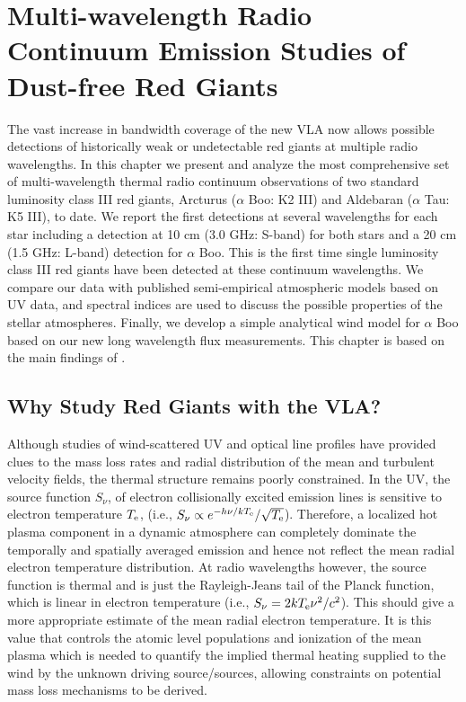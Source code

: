 
\chapter{Multi-wavelength Radio Continuum Emission Studies of \\ Dust-free Red Giants} \label{chap:6}

The vast increase in bandwidth coverage of the new VLA now allows possible detections of historically weak or undetectable red giants at multiple radio wavelengths. In this chapter we present and analyze the most comprehensive set of multi-wavelength thermal radio continuum observations of two standard luminosity class III red giants, Arcturus ($\alpha$ Boo: K2 III) and Aldebaran ($\alpha$ Tau: K5 III), to date. We report the first detections at several wavelengths for each star including a detection at 10 cm (3.0 GHz: S-band) for both stars and a 20 cm (1.5 GHz: L-band) detection for $\alpha$ Boo. This is the first time single luminosity class III red giants have been detected at these continuum wavelengths. We compare our data with published semi-empirical atmospheric models based on UV data, and spectral indices are used to discuss the possible properties of the stellar atmospheres. Finally, we develop a simple analytical wind model for $\alpha$ Boo based on our new long wavelength flux measurements. This chapter is based on the main findings of \cite{ogorman_2013}.

\section{Why Study Red Giants with the VLA?}\label{sec:6.1}
Although studies of wind-scattered UV and optical line profiles have provided clues to the mass loss rates and radial distribution of the mean and turbulent velocity fields, the thermal structure remains poorly constrained. In the UV, the source function $S_{\nu}$, of electron collisionally excited emission lines is sensitive to electron temperature $T_{\rm{e}}$, (i.e., $S_{\nu} \propto e^{-h\nu /kT_{\rm{e}}}/\sqrt{T_{\rm{e}}}$). Therefore, a localized hot plasma component in a dynamic atmosphere can completely dominate the temporally and spatially averaged emission and hence not reflect the mean radial electron temperature distribution. At radio wavelengths however, the source function is thermal and is just the Rayleigh-Jeans tail of the Planck function, which is linear in electron temperature (i.e., $S_{\nu} = {2kT_{\rm{e}}\nu ^2 /c^2}$). This should give a more appropriate estimate of the mean radial electron temperature. It is this value that controls the atomic level populations and ionization of the mean plasma which is needed to quantify the implied thermal heating supplied to the  wind by the unknown driving source/sources, allowing constraints on potential mass loss mechanisms to be derived.

